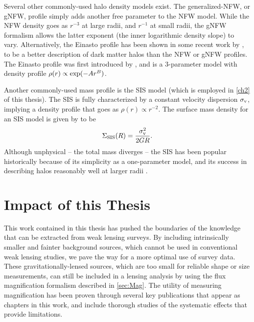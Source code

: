 Several other commonly-used halo density models exist. The generalized-\ac{NFW}, or g\ac{NFW}, profile simply adds another free parameter to the \ac{NFW} model. While the \ac{NFW} density goes as $r^{-3}$ at large radii, and $r^{-1}$ at small radii, the g\ac{NFW} formalism allows the latter exponent (the inner logarithmic density slope) to vary. Alternatively, the Einasto profile has been shown in some recent work by \citet{Dutton14}, to be a better description of dark matter halos than the \ac{NFW} or g\ac{NFW} profiles. The Einasto profile was first introduced by \citet{Einasto65}, and is a 3-parameter model with density profile $\rho(r) \propto {\rm exp}(-Ar^{B})$.

Another commonly-used mass profile is the \ac{SIS} model (which is employed in \autoref{ch2} of this thesis). The \ac{SIS} is fully characterized by a constant velocity dispersion $\sigma_{\rm v}$, implying a density profile that goes as $\rho(r) \propto r^{-2}$. The surface mass density for an \ac{SIS} model is given by \citet{BS01} to be
\begin{equation}
\Sigma_{\rm SIS}(R) = \frac{\sigma_{\rm v}^2}{2 G R}.
\end{equation}
Although unphysical -- the total mass diverges -- the \ac{SIS} has been popular historically because of its simplicity as a one-parameter model, and its success in describing halos reasonably well at larger radii \citep{Schneider06_WeakGravLens}.

\section{Impact of this Thesis}
\label{sec:Impact}

This work contained in this thesis has pushed the boundaries of the knowledge that can be extracted from weak lensing surveys. By including intrinsically smaller and fainter background sources, which cannot be used in conventional weak lensing studies, we pave the way for a more optimal use of survey data. These gravitationally-lensed sources, which are too small for reliable shape or size measurements, can still be included in a lensing analysis by using the flux magnification formalism described in \autoref{sec:Mag}. The utility of measuring magnification has been proven through several key publications that appear as chapters in this work, and include thorough studies of the systematic effects that provide limitations. 

